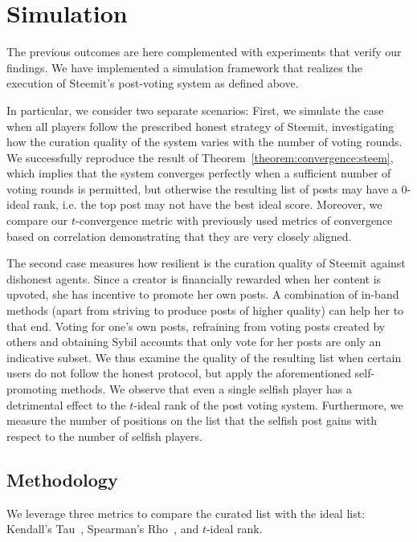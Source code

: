\section{Simulation}
    The previous outcomes are here complemented with experiments that verify our
    findings. We have implemented a simulation framework that realizes the
    execution of Steemit's post-voting system as defined above.

    In particular, we consider two separate scenarios: First, we simulate the
    case when all players follow the prescribed honest strategy of Steemit,
    investigating how the curation quality of the system varies with the number
    of voting rounds. We successfully reproduce the result of
    Theorem~\ref{theorem:convergence:steem}, which implies that the system
    converges perfectly when a sufficient number of voting rounds is permitted,
    but otherwise the resulting list of posts may have a 0-ideal rank, i.e. the
    top post may not have the best ideal score. Moreover, we compare our
    $t$-convergence metric with previously used metrics of convergence based on
    correlation demonstrating that they are very closely aligned.

    The second case measures how resilient is the curation quality of Steemit
    against dishonest agents. Since a creator is financially rewarded when her
    content is upvoted, she has incentive to promote her own posts. A
    combination of in-band methods (apart from striving to produce posts of
    higher quality) can help her to that end. Voting for one's own posts,
    refraining from voting posts created by others and obtaining Sybil accounts
    that only vote for her posts are only an indicative subset. We thus examine
    the quality of the resulting list when certain users do not follow the
    honest protocol, but apply the aforementioned self-promoting methods. We
    observe that even a single selfish player has a detrimental effect to the
    $t$-ideal rank of the post voting system. Furthermore, we measure the number
    of positions on the list that the selfish post gains with respect to the
    number of selfish players.

  \subsection{Methodology}
    We leverage three metrics to compare the curated list with the ideal list:
    Kendall's Tau~\cite{kendall1955rank}, Spearman's
    Rho~\cite{spearman1904proof}, and $t$-ideal rank.

